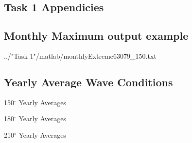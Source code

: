 \documentclass[10pt,letterpaper,titlepage]{report}
\begin{document}
\begin{appendices}
\chapter{Task 1 Appendicies}

\section{Monthly Maximum output example}
 {../"Task 1"/matlab/monthlyExtreme63079_150.txt}

\section{Yearly Average Wave Conditions}

\begin{minipage}{0.36\textwidth}
\begin{table}[H]
	
	\label{yearly150}
	\caption{150$^\circ$ Yearly Averages}
\end{table}
\end{minipage}
\begin{minipage}{0.36\textwidth}
\begin{table}[H]
	
	\label{yearly180}
	\caption{180$^\circ$ Yearly Averages}
\end{table}
\end{minipage}
\begin{minipage}{0.36\textwidth}
\begin{table}[H]
	
	\label{yearly210}
	\caption{210$^\circ$ Yearly Averages}
\end{table}
\end{minipage}

\end{appendices}
\end{document}
